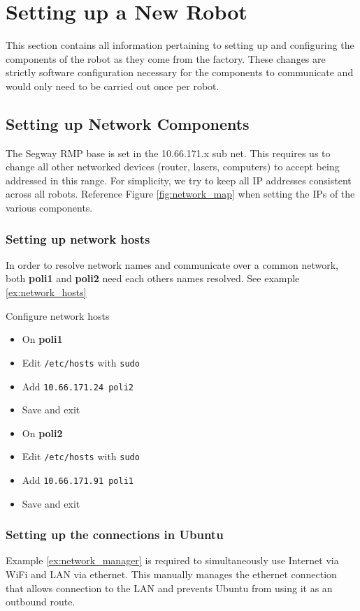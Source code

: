 \chapter{Setting up a New Robot}\label{ch:setting_up_new_robot}
This section contains all information pertaining to setting up and configuring the components of the robot as they come from the factory. 
These changes are strictly software configuration necessary for the components to communicate and would only need to be carried out once per robot.

\section{Setting up Network Components}
The Segway RMP base is set in the 10.66.171.x sub net. This requires us to change all other networked devices (router, lasers, computers) to accept being addressed in this range. For simplicity, we try to keep all IP addresses consistent across all robots. Reference Figure \ref{fig:network_map} when setting the IPs of the various components.

\subsection{Setting up network hosts}
In order to resolve network names and communicate over a common network, both \textbf{poli1} and \textbf{poli2} need each others names resolved. See example \ref{ex:network_hosts}

\begin{example}{Configure network hosts}\label{ex:network_hosts}
  \begin{itemize}
    \item On \textbf{poli1}
    \item Edit \texttt{/etc/hosts} with \texttt{sudo}
    \item Add \texttt{10.66.171.24 poli2}
    \item Save and exit
    \item On \textbf{poli2}
    \item Edit \texttt{/etc/hosts} with \texttt{sudo}
    \item Add \texttt{10.66.171.91 poli1}
    \item Save and exit
  \end{itemize}
\end{example}

\subsection{Setting up the connections in Ubuntu}
Example \ref{ex:network_manager} is required to simultaneously use Internet via WiFi and LAN via ethernet. 
This manually manages the ethernet connection that allows connection to the LAN and prevents Ubuntu from using it as an outbound route.

